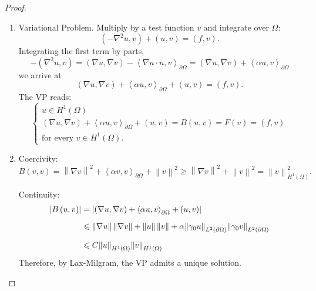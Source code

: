 \documentclass[letterpaper,twoside,11pt]{article}
\theoremstyle{mystyle}
\begin{document}
\begin{proof}
  \begin{enumerate}
    \item Variational Problem. Multiply by a test function $v$ and integrate over $\Omega$:
    \[\left( { - {\nabla ^2}u,v} \right) + \left( {u,v} \right) = \left( {f,v} \right).\]
    Integrating the first term by parts, 
    \[ - \left( {{\nabla ^2}u,v} \right) = \left( {\nabla u,\nabla v} \right) - {\left\langle {\nabla u \cdot n,v} \right\rangle _{\partial \Omega }} = \left( {\nabla u,\nabla v} \right) + {\left\langle {\alpha u,v} \right\rangle _{\partial \Omega }}\]
    we arrive at 
    \[\left( {\nabla u,\nabla v} \right) + {\left\langle {\alpha u,v} \right\rangle _{\partial \Omega }} + \left( {u,v} \right) = \left( {f,v} \right).\]
    The VP reads: 
    \[\left\{ {\begin{array}{*{20}{l}}
      {u \in {H^1}\left( \Omega  \right)} \\[.2cm] 
      {\left( {\nabla u,\nabla v} \right) + {{\left\langle {\alpha u,v} \right\rangle }_{\partial \Omega }} + \left( {u,v} \right) = B\left( {u,v} \right) = F\left( v \right) = \left( {f,v} \right)} \\[.2cm]
      \text{for every } v\in H^1 (\Omega).  
    \end{array}} \right.\]
    \item Coercivity:  
    \[B\left( {v,v} \right) = {\left\| {\nabla v} \right\|^2} + {\left\langle {\alpha v,v} \right\rangle _{\partial \Omega }} + {\left\| v \right\|^2} \geqslant {\left\| {\nabla v} \right\|^2} + {\left\| v \right\|^2} = \left\| v \right\|_{{H^1}\left( \Omega  \right)}^2.\]


    Continuity: 
    \begin{align*}
        \left| {B\left( {u,v} \right)} \right| &= \left| {\left( {\nabla u,\nabla v} \right) + {{\left\langle {\alpha u,v} \right\rangle }_{\partial \Omega }} + \left( {u,v} \right)} \right| \hfill \\[.2cm]
         &\leqslant \left\| {\nabla u} \right\|\left\| {\nabla v} \right\| + \left\| u \right\|\left\| v \right\| + \alpha {\left\| {{\gamma _0}u} \right\|_{{L^2}\left( {\partial \Omega } \right)}}{\left\| {{\gamma _0}v} \right\|_{{L^2}\left( {\partial \Omega } \right)}} \hfill \\[.2cm]
         &\leqslant C{\left\| u \right\|_{{H^1}\left( \Omega  \right)}}{\left\| v \right\|_{{H^1}\left( \Omega  \right)}}  
    \end{align*}
    Therefore, by Lax-Milgram, the VP admits a unique solution.

  \end{enumerate}
\end{proof}
\end{document}

